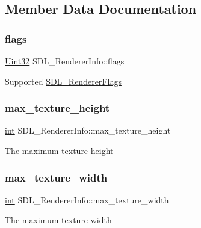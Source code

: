 \subsection{Member Data Documentation}
\mbox{\label{struct_s_d_l___renderer_info_a95cf0ffd1704fd0a4dd8ceac6c9f0542}} 
\subsubsection{\texorpdfstring{flags}{flags}}
{\footnotesize\ttfamily \mbox{\hyperlink{_s_d_l__stdinc_8h_add440eff171ea5f55cb00c4a9ab8672d}{Uint32}} S\+D\+L\+\_\+\+Renderer\+Info\+::flags}

Supported \mbox{\hyperlink{_s_d_l__render_8h_a3a6e51bbee5fd3f8ee0c9f7504ae4130}{S\+D\+L\+\_\+\+Renderer\+Flags}} \mbox{\label{struct_s_d_l___renderer_info_a87c6a13e8d535c2148f8913c05e13102}} 
\subsubsection{\texorpdfstring{max\_texture\_height}{max\_texture\_height}}
{\footnotesize\ttfamily \mbox{\hyperlink{warnings_8h_a74f207b5aa4ba51c3a2ad59b219a423b}{int}} S\+D\+L\+\_\+\+Renderer\+Info\+::max\+\_\+texture\+\_\+height}

The maximum texture height \mbox{\label{struct_s_d_l___renderer_info_a6e6757e3d5c1f0922adaba39380edfa6}} 
\subsubsection{\texorpdfstring{max\_texture\_width}{max\_texture\_width}}
{\footnotesize\ttfamily \mbox{\hyperlink{warnings_8h_a74f207b5aa4ba51c3a2ad59b219a423b}{int}} S\+D\+L\+\_\+\+Renderer\+Info\+::max\+\_\+texture\+\_\+width}

The maximum texture width \mbox{\label{struct_s_d_l___renderer_info_a433ecb2865c81ba9f28038e56a4ae6f3}} 
